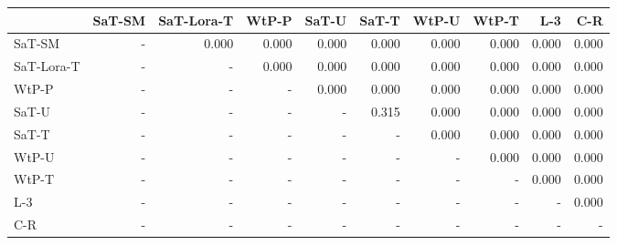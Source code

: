 \begin{tabular}{lrrrrrrrrr}
\toprule
 & SaT-SM & SaT-Lora-T & WtP-P & SaT-U & SaT-T & WtP-U & WtP-T & L-3 & C-R \\
\midrule
SaT-SM & - & 0.000 & 0.000 & 0.000 & 0.000 & 0.000 & 0.000 & 0.000 & 0.000 \\
SaT-Lora-T & - & - & 0.000 & 0.000 & 0.000 & 0.000 & 0.000 & 0.000 & 0.000 \\
WtP-P & - & - & - & 0.000 & 0.000 & 0.000 & 0.000 & 0.000 & 0.000 \\
SaT-U & - & - & - & - & 0.315 & 0.000 & 0.000 & 0.000 & 0.000 \\
SaT-T & - & - & - & - & - & 0.000 & 0.000 & 0.000 & 0.000 \\
WtP-U & - & - & - & - & - & - & 0.000 & 0.000 & 0.000 \\
WtP-T & - & - & - & - & - & - & - & 0.000 & 0.000 \\
L-3 & - & - & - & - & - & - & - & - & 0.000 \\
C-R & - & - & - & - & - & - & - & - & - \\
\bottomrule
\end{tabular}

